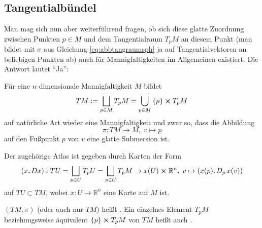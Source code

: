 \documentclass[../H_Analysis_main.tex]{subfiles}
\begin{document}
		\subsection{Tangentialbündel}
Man mag sich nun aber weiterführend fragen, ob sich diese glatte Zuordnung zwischen Punkten $p \in M$ und dem Tangentialraum $T_p M$ an diesem Punkt (man bildet mit $\sigma$ aus Gleichung \eqref{eq:abbtangraumsph} ja auf Tangentialvektoren an beliebigen Punkten ab) auch für Mannigfaltigkeiten im Allgemeinen existiert. Die Antwort lautet \enquote{Ja}:


\begin{satz}
Für eine $n$-dimensionale Mannigfaltigkeit $M$ bildet
\begin{equation}
TM := \bigsqcup_{p \in M} T_p M = \bigcup_{p \in M} \qty{p} \cross T_p M
\end{equation}
auf natürliche Art wieder eine Mannigfaltigkeit und zwar so, dass die Abbildung
\begin{equation}\label{eq:proj1}
\pi: TM \rightarrow M, \; v \mapsto p
\end{equation}
auf den Fußpunkt $p$ von $v$ eine glatte Submersion ist.

Der zugehörige Atlas ist gegeben durch Karten der Form
\begin{equation}\label{eq:indktb}
\qty(x, Dx): TU = \bigsqcup_{p \in U} T_p U = \bigsqcup_{p \in U} T_p M \rightarrow x(U) \cross \mathbb{R}^n, \; v \mapsto \qty(x(p), D_p \, x(v))
\end{equation}
auf $TU \subset TM$, wobei $x: U \rightarrow \mathbb{R}^n$ eine Karte auf $M$ ist.
\end{satz}

\begin{defi}[Tangentialbündel]
$(TM, \pi)$ (oder auch nur $TM$) heißt . Ein einzelnes Element $T_p M$ beziehungsweise äquivalent $\qty{p} \cross T_p M $ von $TM$ heißt auch .
\end{defi}
\end{document}
